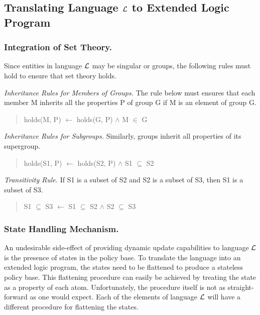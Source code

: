 \documentclass{llncs}
\begin{document}
    \subsection{Translating Language $\cal{L}$ to Extended Logic Program}

      \subsubsection{Integration of Set Theory.}

        Since entities in language $\cal{L}$ may be singular or groups,
        the following rules must hold to ensure that set theory holds.

        \emph{Inheritance Rules for Members of Groups.} The rule below must
        ensures that each member M inherits all the properties P of group G if
        M is an element of group G.

        \begin{quote}
          holds(M, P) $\leftarrow$ holds(G, P) $\land$ M $\in$ G
        \end{quote}

        \emph{Inheritance Rules for Subgroups.} Similarly, groups inherit all
        properties of its supergroup.

        \begin{quote}
          holds(S1, P) $\leftarrow$ holds(S2, P) $\land$ S1 $\subseteq$ S2
        \end{quote}

        \emph{Transitivity Rule.} If S1 is a subset of S2 and S2 is a subset
        of S3, then S1 is a subset of S3.

        \begin{quote}
          S1 $\subseteq$ S3 $\leftarrow$ S1 $\subseteq$ S2 $\land$ S2
          $\subseteq$ S3
        \end{quote}

      \subsubsection{State Handling Mechanism.}

        An undesirable side-effect of providing dynamic update capabilities to
        language $\cal{L}$ is the presence of states in the policy base. To
        translate the language into an extended logic program, the states need
        to be flattened to produce a stateless policy base. This flattening
        procedure can easily be achieved by treating the state as a property
        of each atom. Unfortunately, the procedure itself is not as straight-
        forward as one would expect. Each of the elements of language $\cal{L}$
        will have a different procedure for flattening the states.
\end{document}
